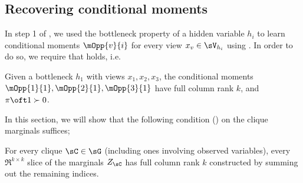 \subsection{Recovering conditional moments}

In step 1 of \LearnMarginals, we used the bottleneck property of a hidden
  variable $h_i$ to learn conditional moments $\mOpp{v}{i}$ for every
  view $x_v \in \sV_{h_i}$ using \TensorFactorize. 
In order to do so, we require that  holds, i.e.
\begin{assumption*}
  Given a bottleneck $h_1$ with views $x_1, x_2, x_3$, the conditional
  moments $\mOpp{1}{1}, \mOpp{2}{1}, \mOpp{3}{1}$ have full column rank
  $k$, and $\pi\oft 1 \succ 0$.
\end{assumption*}

In this section, we will show that the following condition
  () on the clique marginals suffices;
\begin{assumption*}
For every clique $\sC \in \sG$ (including ones involving observed variables),
  every $\Re^{k \times k}$ slice of the marginals $Z_\sC$ has full column
  rank $k$ constructed by summing out the remaining indices.
\end{assumption*}

%
%
%
%
%

